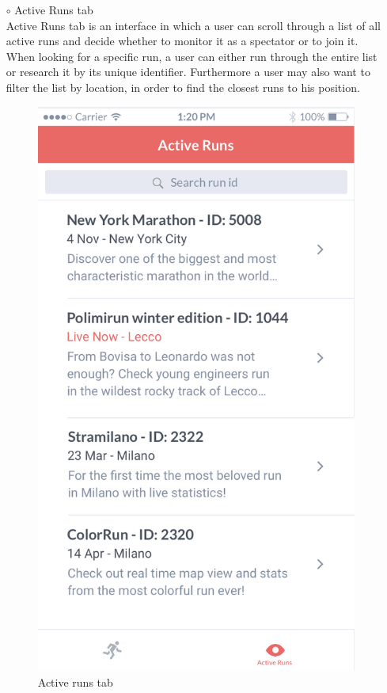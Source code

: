 \documentclass[titlepage]{article}
\begin{document}
\begin{itemize}
\begin{itemize}
\begin{itemize}
					\item[$\circ$] Active Runs tab \\
Active Runs tab is an interface in which a user can scroll through a list of all active runs and decide whether to monitor it as a spectator or to join it. When looking for a specific run, a user can either run through the entire list or research it by its unique identifier. Furthermore a user may also want to filter the list by location, in order to find the closest runs to his position.\\
					\begin{figure}[H]
						\center
  						\includegraphics[width=0.5\columnwidth]{Mockup/mockupActiveRunsSU.png}
  						\caption{Active runs tab}
 					 	\label{fig:ActiveRuns}
					\end{figure}
				\end{itemize}


\end{itemize}
\end{itemize}
\end{document}
